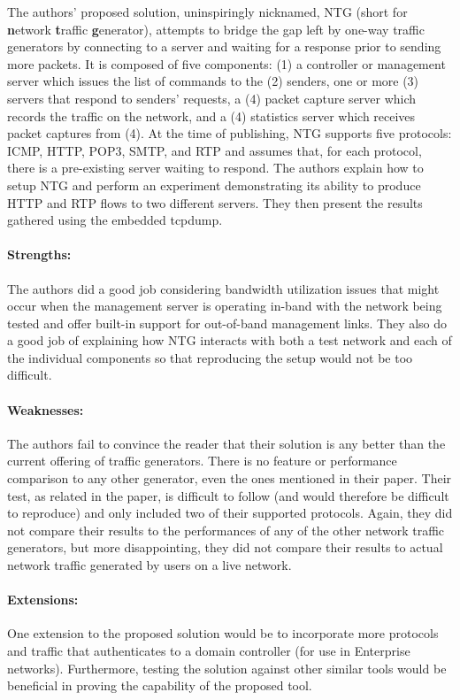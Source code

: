 \documentclass[11pt]{article}
\begin{document}
The authors' proposed solution, uninspiringly nicknamed, NTG (short for \textbf{n}etwork \textbf{t}raffic \textbf{g}enerator), attempts to bridge the gap left by one-way traffic generators by connecting to a server and waiting for a response prior to sending more packets.  It is composed of five components: (1) a controller or management server which issues the list of commands to the (2) senders, one or more (3) servers that respond to senders' requests, a (4) packet capture server which records the traffic on the network, and a (4) statistics server which receives packet captures from (4).  At the time of publishing, NTG supports five protocols: ICMP, HTTP, POP3, SMTP, and RTP and assumes that, for each protocol, there is a pre-existing server waiting to respond.  The authors explain how to setup NTG and perform an experiment demonstrating its ability to produce HTTP and RTP flows to two different servers.  They then present the results gathered using the embedded tcpdump.

\paragraph{Strengths:} The authors did a good job considering bandwidth utilization issues that might occur when the management server is operating in-band with the network being tested and offer built-in support for out-of-band management links.  They also do a good job of explaining how NTG interacts with both a test network and each of the individual components so that reproducing the setup would not be too difficult. 

\paragraph{Weaknesses:}  The authors fail to convince the reader that their solution is any better than the current offering of traffic generators.  There is no feature or performance comparison to any other generator, even the ones mentioned in their paper.  Their test, as related in the paper, is difficult to follow (and would therefore be difficult to reproduce) and only included two of their supported protocols.  Again, they did not compare their results to the performances of any of the other network traffic generators, but more disappointing, they did not compare their results to actual network traffic generated by users on a live network.

\paragraph{Extensions:}  One extension to the proposed solution would be to incorporate more protocols and traffic that authenticates to a domain controller (for use in Enterprise networks).  Furthermore, testing the solution against other similar tools would be beneficial in proving the capability of the proposed tool.
\end{document}
